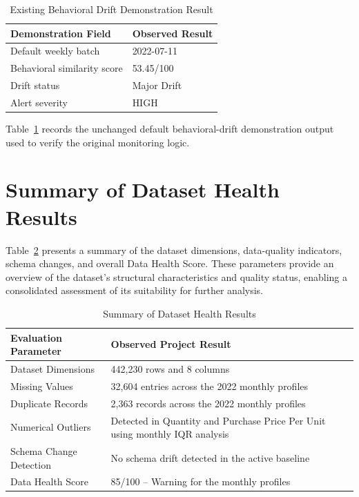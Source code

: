 \documentclass[12pt,a4paper]{report}
\begin{document}
\begin{table}[H]
\centering
\renewcommand{\arraystretch}{1.2}
\begin{tabular}{|p{5.2cm}|p{6.8cm}|}
\hline
\textbf{Demonstration Field} & \textbf{Observed Result}\\
\hline
Default weekly batch & 2022-07-11\\
\hline
Behavioral similarity score & 53.45/100\\
\hline
Drift status & Major Drift\\
\hline
Alert severity & HIGH\\
\hline
\end{tabular}
\caption{Existing Behavioral Drift Demonstration Result}
\label{tab:drift_demo}
\end{table}

Table~\ref{tab:drift_demo} records the unchanged default behavioral-drift demonstration output used to verify the original monitoring logic.





\clearpage
\section{Summary of Dataset Health Results}


Table~\ref{tab:health_results} presents a summary of the dataset dimensions, data-quality indicators, schema changes, and overall Data Health Score. These parameters provide an overview of the dataset's structural characteristics and quality status, enabling a consolidated assessment of its suitability for further analysis.



\begin{table}[H]
\centering

\renewcommand{\arraystretch}{1.2}
\begin{tabular}{|p{6.0cm}|p{6.2cm}|}
\hline
\textbf{Evaluation Parameter} & \textbf{Observed Project Result}\\
\hline
Dataset Dimensions & 442,230 rows and 8 columns\\
\hline
Missing Values & 32,604 entries across the 2022 monthly profiles\\
\hline
Duplicate Records & 2,363 records across the 2022 monthly profiles\\
\hline
Numerical Outliers & Detected in Quantity and Purchase Price Per Unit using monthly IQR analysis\\
\hline
Schema Change Detection & No schema drift detected in the active baseline\\
\hline
Data Health Score & 85/100 -- Warning for the monthly profiles\\
\hline
\end{tabular}
\caption{ Summary of Dataset Health Results}
\label{tab:health_results}
\end{table}
\end{document}
